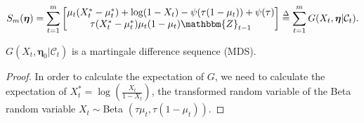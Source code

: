 \documentclass[10pt,a4paper]{amsart}
\begin{document}
\begin{equation}
\label{eq: score vector}
    S_m(\bm{\eta}) = \sum_{t=1}^m \begin{bmatrix} \mu_t(X_t^*-\mu_t^*)+\log(1-X_t)-\psi(\tau(1-\mu_t))+\psi(\tau) \\
    \tau(X_t^*-\mu_t^*)\mu_t(1-\mu_t) \mathbbm{Z}_{t-1}
    \end{bmatrix} \overset{\Delta}{=} \sum_{t=1}^m G(X_t,\bm{\eta}|
    \mathcal{C}_t).
\end{equation}

\begin{lemma}
\label{lemma: G is MDS}
$G(X_t, \bm{\eta}_0|\mathcal{C}_t)$ is a martingale difference sequence (MDS).
\end{lemma}

\begin{proof}
In order to calculate the expectation of $G$, we need to calculate the expectation of $X_t^* = \log (\frac{X_t}{1-X_t})$, the transformed random variable of the Beta random variable $X_t \sim$Beta $(\tau \mu_t, \tau(1-\mu_t)).$


\end{proof}
\end{document}
